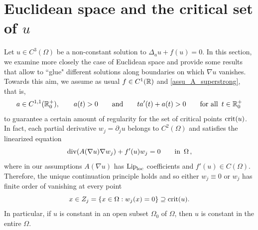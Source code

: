 \documentclass[10 pt,a4paper]{article}
\theoremstyle{definition}
\begin{document}
%

\section{Euclidean space and the critical set of $u$}\label{sec_critical}

Let $u \in C^3(\Omega)$ be a non-constant solution to $\Delta_a u + f(u) = 0$. In this section, we examine more closely the case of Euclidean space and provide some results that allow to ``glue" different solutions along boundaries on which $\nabla u$ vanishes. Towards this aim, we assume as usual $f \in C^1(\mathbb R)$ and \eqref{assu_A_superstrong}, that is, 
\[
a\in C^{1,1}(\mathbb R_0^+), \qquad a(t) > 0 \qquad \text{and} \qquad ta'(t) + a(t) > 0 \qquad \text{for all } \, t \in \mathbb R^+_0
\]
to guarantee a certain amount of regularity for the set of critical points ${\rm crit}(u)$. In fact, each partial derivative $w_j = \partial_j u$ belongs to $C^2(\Omega)$ and satisfies the linearized equation
\begin{equation}\label{eq_partialder}
\mathrm{div}(A(\nabla u)\nabla w_j) + f'(u) w_j = 0 \qquad \text{in } \, \Omega \, ,
\end{equation}
where in our assumptions $A(\nabla u)$ has $\mathrm{Lip}_{\mathrm{loc}}$ coefficients and $f'(u) \in C(\Omega)$. Therefore, the unique continuation principle holds and so either $w_j \equiv 0$ or $w_j$ has finite order of vanishing at every point 
\[
x \in Z_j = \{ x \in \Omega : w_j(x) = 0 \} \supseteq {\rm crit}(u).
\]
In particular, if $u$ is constant in an open subset $\Omega_0$ of $\Omega$, then $u$ is constant in the entire $\Omega$. 
\end{document}

